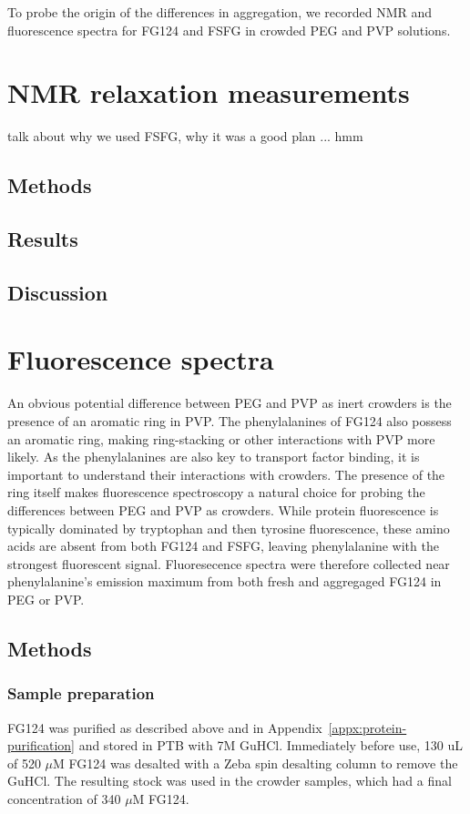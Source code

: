 To probe the origin of the differences in aggregation, we recorded NMR and fluorescence spectra for FG124 and FSFG in crowded PEG and PVP solutions.

\section{NMR relaxation measurements}
talk about why we used FSFG, why it was a good plan ... hmm
\subsection{Methods}
\subsection{Results}
\subsection{Discussion}

\section{Fluorescence spectra}

An obvious potential difference between PEG and PVP as inert crowders is the presence of an aromatic ring in PVP.  The phenylalanines of FG124 also possess an aromatic ring, making ring-stacking or other interactions with PVP more likely.  As the phenylalanines are also key to transport factor binding, it is important to understand their interactions with crowders.  The presence of the ring itself makes fluorescence spectroscopy a natural choice for probing the differences between PEG and PVP as crowders.  While protein fluorescence is typically dominated by tryptophan and then tyrosine fluorescence, these amino acids are absent from both FG124 and FSFG, leaving phenylalanine with the strongest fluorescent signal.  Fluoresecence spectra were therefore collected near phenylalanine's emission maximum from both fresh and aggregaged FG124 in PEG or PVP.

\subsection{Methods}

\subsubsection{Sample preparation}
FG124 was purified as described above and in Appendix~\ref{appx:protein-purification} and stored in PTB with 7M GuHCl.  Immediately before use, 130 uL of 520 $\mu$M FG124 was desalted with a Zeba spin desalting column to remove the GuHCl.  The resulting stock was used in the crowder samples, which had a final concentration of 340 $\mu$M FG124. 

